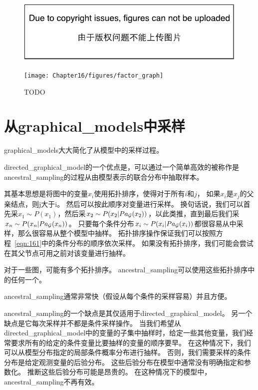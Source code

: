 \begin{figure}[!htb]
\ifOpenSource
\centerline{\includegraphics{figure.pdf}}
\else
	\centerline{\texttt{[image: Chapter16/figures/factor\_graph]}}	
\fi
	\caption{TODO}
	\label{fig:factor_graph}
\end{figure}


\section{从\gls{graphical_models}中采样}
\label{sec:sampling_from_graphical_models}

\gls{graphical_models}大大简化了从模型中的采样过程。


\gls{directed_graphical_model}的一个优点是，可以通过一个简单高效的被称作是\gls{ancestral_sampling}的过程从由模型表示的联合分布中抽取样本。


其基本思想是将图中的变量$x_i$使用拓扑排序，使得对于所有$i$和$j$，
如果$x_i$是$x_j$的父亲结点，则j大于i。
然后可以按此顺序对变量进行采样。
换句话说，我们可以首先采$x_1\sim P(x_1)$，然后采$x_2\sim P(x_2\vert Pa_{\mathcal{G}}(x_2))$，以此类推，直到最后我们采$x_n\sim P(x_n\vert Pa_{\mathcal{G}}(x_n))$。
只要每个条件分布$x_i\sim P(x_i\vert Pa_{\mathcal{G}}(x_i))$都很容易从中采样，那么很容易从整个模型中抽样。
拓扑排序操作保证我们可以按照方程~\eqref{eqn:161}中的条件分布的顺序依次采样。
如果没有拓扑排序，我们可能会尝试在其父节点可用之前对该变量进行抽样。


对于一些图，可能有多个拓扑排序。 
\gls{ancestral_sampling}可以使用这些拓扑排序中的任何一个。

\gls{ancestral_sampling}通常非常快（假设从每个条件的采样容易）并且方便。


\gls{ancestral_sampling}的一个缺点是其仅适用于\gls{directed_graphical_model}。 
另一个缺点是它每次采样并不都是条件采样操作。
当我们希望从\gls{directed_graphical_model}中的变量的子集中抽样时，给定一些其他变量，我们经常要求所有的给定的条件变量比要抽样的变量的顺序要早。
在这种情况下，我们可以从模型分布指定的局部条件概率分布进行抽样。 
否则，我们需要采样的条件分布是给定观测变量的后验分布。
这些后验分布在模型中通常没有明确指定和参数化。 
推断这些后验分布可能是昂贵的。 
在这种情况下的模型中，\gls{ancestral_sampling}不再有效。



